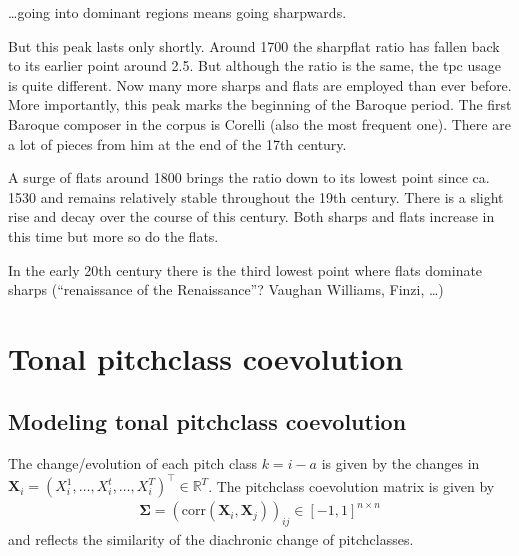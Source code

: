 \documentclass[letterpaper,10pt,english]{sphinxmanual}
\begin{document}
\sphinxAtStartPar
…going into dominant regions means going sharpwards.

\sphinxAtStartPar
But this peak lasts only shortly. Around 1700 the sharp\sphinxhyphen{}flat ratio has
fallen back to its earlier point around 2.5. But although the ratio is
the same, the tpc usage is quite different. Now many more sharps and
flats are employed than ever before. More importantly, this peak marks
the beginning of the Baroque period. The first Baroque composer in the
corpus is Corelli (also the most frequent one). There are a lot of
pieces from him at the end of the 17th century.

\sphinxAtStartPar
A surge of flats around 1800 brings the ratio down to its lowest point
since ca. 1530 and remains relatively stable throughout the 19th
century. There is a slight rise and decay over the course of this
century. Both sharps and flats increase in this time but more so do the
flats.

\sphinxAtStartPar
In the early 20th century there is the third lowest point where flats
dominate sharps (“renaissance of the Renaissance”? Vaughan Williams,
Finzi, …)


\chapter{Tonal pitch\sphinxhyphen{}class coevolution}
\label{\detokenize{coevolution:tonal-pitch-class-coevolution}}\label{\detokenize{coevolution::doc}}

\section{Modeling tonal pitch\sphinxhyphen{}class coevolution}
\label{\detokenize{coevolution:modeling-tonal-pitch-class-coevolution}}
\sphinxAtStartPar
The change/evolution of each pitch class \(k=i-a\) is given by the
changes in
\(\mathbf{X}_i=(X^{1}_i,\dots,X^{t}_i,\dots,X^{T}_i)^\top\in \mathbb{R}^{T}\).
The pitch\sphinxhyphen{}class coevolution matrix is given by
\begin{equation*}
\begin{split}\mathbf\Sigma=\left(\mathrm{corr}(\mathbf{X}_i, \mathbf{X}_j)\right)_{ij}\in[-1,1]^{n\times n}\end{split}
\end{equation*}
\sphinxAtStartPar
and reflects the similarity of the diachronic change of pitch\sphinxhyphen{}classes.
\end{document}
